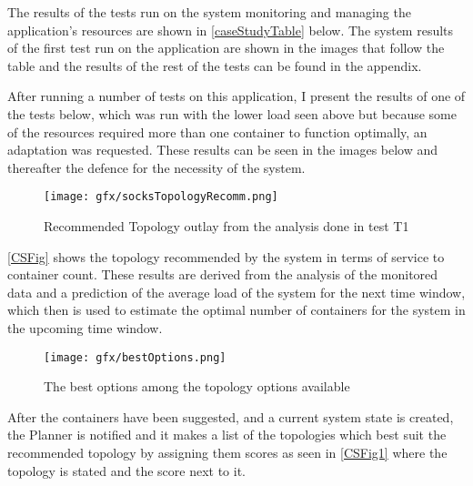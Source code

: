 The results of the tests run on the system monitoring and managing the application's resources are shown in \autoref{caseStudyTable} below. The system results of the first test run on the application are shown in the images that follow the table and the results of the rest of the tests can be found in the appendix.
\begin{table}[H]
\caption{Test case 2 run on the application.}
\label{caseStudyTable}
\end{table}

After running a number of tests on this application, I present the results of one of the tests below, which was run with the lower load seen above but because some of the resources required more than one container to function optimally, an adaptation was requested. These results can be seen in the images below and thereafter the defence for the necessity of the system.

\begin{figure} [H]
   \centering 
   \texttt{[image: gfx/socksTopologyRecomm.png]}
   \caption{ Recommended Topology outlay from the analysis done in test T1} 
   \label{CSFig} 
\end{figure}

\autoref{CSFig} shows the topology recommended by the system in terms of service to container count. These results are derived from the analysis of the monitored data and a prediction of the average load of the system for the next time window, which then is used to estimate the optimal number of containers for the system in the upcoming time window.

\begin{figure} [H]
   \centering 
   \texttt{[image: gfx/bestOptions.png]}
   \caption{The best options among the topology options available} 
   \label{CSFig1} 
\end{figure}

After the containers have been suggested, and a current system state is created, the Planner is notified and it makes a list of the topologies which best suit the recommended topology by assigning them scores as seen in \autoref{CSFig1} where the topology is stated and the score next to it.

